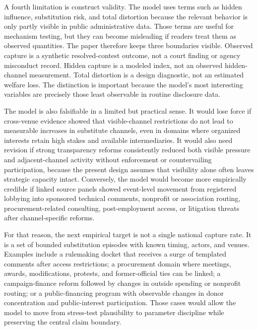 A fourth limitation is construct validity. The model uses terms such as hidden influence, substitution risk, and total distortion because the relevant behavior is only partly visible in public administrative data. Those terms are useful for mechanism testing, but they can become misleading if readers treat them as observed quantities. The paper therefore keeps three boundaries visible. Observed capture is a synthetic resolved-contest outcome, not a court finding or agency misconduct record. Hidden capture is a modeled index, not an observed hidden-channel measurement. Total distortion is a design diagnostic, not an estimated welfare loss. The distinction is important because the model's most interesting variables are precisely those least observable in routine disclosure data.

The model is also falsifiable in a limited but practical sense. It would lose force if cross-venue evidence showed that visible-channel restrictions do not lead to measurable increases in substitute channels, even in domains where organized interests retain high stakes and available intermediaries. It would also need revision if strong transparency reforms consistently reduced both visible pressure and adjacent-channel activity without enforcement or countervailing participation, because the present design assumes that visibility alone often leaves strategic capacity intact. Conversely, the model would become more empirically credible if linked source panels showed event-level movement from registered lobbying into sponsored technical comments, nonprofit or association routing, procurement-related consulting, post-employment access, or litigation threats after channel-specific reforms.

For that reason, the next empirical target is not a single national capture rate. It is a set of bounded substitution episodes with known timing, actors, and venues. Examples include a rulemaking docket that receives a surge of templated comments after access restrictions; a procurement domain where meetings, awards, modifications, protests, and former-official ties can be linked; a campaign-finance reform followed by changes in outside spending or nonprofit routing; or a public-financing program with observable changes in donor concentration and public-interest participation. Those cases would allow the model to move from stress-test plausibility to parameter discipline while preserving the central claim boundary.
